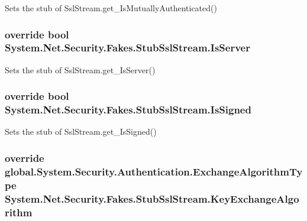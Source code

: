 Sets the stub of Ssl\-Stream.\-get\-\_\-\-Is\-Mutually\-Authenticated()

\hypertarget{class_system_1_1_net_1_1_security_1_1_fakes_1_1_stub_ssl_stream_ad21639340d19961d59a8f111a4b32213}{
\subsubsection[{Is\-Server}]{\setlength{\rightskip}{0pt plus 5cm}override bool System.\-Net.\-Security.\-Fakes.\-Stub\-Ssl\-Stream.\-Is\-Server\hspace{0.3cm}{\ttfamily [get]}}}\label{class_system_1_1_net_1_1_security_1_1_fakes_1_1_stub_ssl_stream_ad21639340d19961d59a8f111a4b32213}


Sets the stub of Ssl\-Stream.\-get\-\_\-\-Is\-Server()

\hypertarget{class_system_1_1_net_1_1_security_1_1_fakes_1_1_stub_ssl_stream_a886bd1e3b51214929db78425b05ed32c}{
\subsubsection[{Is\-Signed}]{\setlength{\rightskip}{0pt plus 5cm}override bool System.\-Net.\-Security.\-Fakes.\-Stub\-Ssl\-Stream.\-Is\-Signed\hspace{0.3cm}{\ttfamily [get]}}}\label{class_system_1_1_net_1_1_security_1_1_fakes_1_1_stub_ssl_stream_a886bd1e3b51214929db78425b05ed32c}


Sets the stub of Ssl\-Stream.\-get\-\_\-\-Is\-Signed()

\hypertarget{class_system_1_1_net_1_1_security_1_1_fakes_1_1_stub_ssl_stream_a100c0caf59537d45324b01a17585eeb0}{
\subsubsection[{Key\-Exchange\-Algorithm}]{\setlength{\rightskip}{0pt plus 5cm}override global.\-System.\-Security.\-Authentication.\-Exchange\-Algorithm\-Type System.\-Net.\-Security.\-Fakes.\-Stub\-Ssl\-Stream.\-Key\-Exchange\-Algorithm\hspace{0.3cm}{\ttfamily [get]}}}\label{class_system_1_1_net_1_1_security_1_1_fakes_1_1_stub_ssl_stream_a100c0caf59537d45324b01a17585eeb0}


